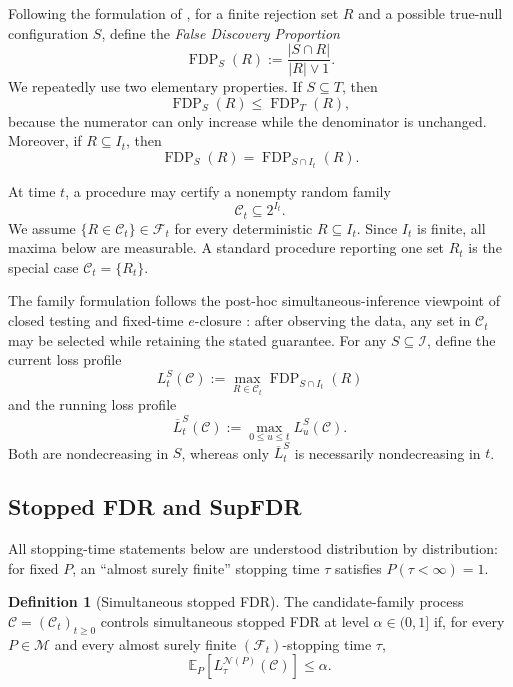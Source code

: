 \documentclass[11pt]{article}
\numberwithin{equation}{section}
\theoremstyle{plain}
\theoremstyle{definition}
\newtheorem{definition}[theorem]{Definition}
\newcommand{\E}{\mathbb E}
\newcommand{\F}{\mathcal F}
\newcommand{\M}{\mathcal M}
\newcommand{\Iuniv}{\mathcal I}
\newcommand{\C}{\mathcal C}
\newcommand{\FDP}{\operatorname{FDP}}
\newcommand{\calN}{\mathcal N}
\newcommand{\loss}{L}
\newcommand{\runloss}{\overline L}
\begin{document}
Following the formulation of \citet{BenjaminiHochberg1995}, for a finite rejection set $R$ and a possible true-null configuration $S$, define the \emph{False Discovery Proportion}
\begin{equation}\label{eq:fdp}
  \FDP_S(R):=\frac{|S\cap R|}{|R|\vee1}.
\end{equation}
We repeatedly use two elementary properties. If $S\subseteq T$, then
\begin{equation}\label{eq:fdp-monotone}
  \FDP_S(R)\leq\FDP_T(R),
\end{equation}
because the numerator can only increase while the denominator is unchanged. Moreover, if $R\subseteq I_t$, then
\begin{equation}\label{eq:fdp-locality}
  \FDP_S(R)=\FDP_{S\cap I_t}(R).
\end{equation}

At time $t$, a procedure may certify a nonempty random family
\[
  \C_t\subseteq2^{I_t}.
\]
We assume $\{R\in\C_t\}\in\F_t$ for every deterministic $R\subseteq I_t$. Since $I_t$ is finite, all maxima below are measurable. A standard procedure reporting one set $R_t$ is the special case $\C_t=\{R_t\}$.

The family formulation follows the post-hoc simultaneous-inference viewpoint of closed testing and fixed-time $e$-closure \citep{GoemanSolari2011,GoemanHemerikSolari2021,XuEtAl2026Closure}: after observing the data, any set in $\C_t$ may be selected while retaining the stated guarantee. For any $S\subseteq\Iuniv$, define the current loss profile
\begin{equation}\label{eq:current-loss}
  \loss_t^S(\C):=\max_{R\in\C_t}\FDP_{S\cap I_t}(R)
\end{equation}
and the running loss profile
\begin{equation}\label{eq:running-loss}
  \runloss_t^S(\C):=\max_{0\leq u\leq t}\loss_u^S(\C).
\end{equation}
Both are nondecreasing in $S$, whereas only $\runloss_t^S$ is necessarily nondecreasing in $t$.

\subsection{Stopped FDR and SupFDR}

All stopping-time statements below are understood distribution by distribution: for fixed $P$, an ``almost surely finite'' stopping time $\tau$ satisfies $P(\tau<\infty)=1$.

\begin{definition}[Simultaneous stopped FDR]\label{def:stopped-fdr}
The candidate-family process $\C=(\C_t)_{t\geq0}$ controls simultaneous stopped FDR at level $\alpha\in(0,1]$ if, for every $P\in\M$ and every almost surely finite $(\F_t)$-stopping time $\tau$,
\begin{equation}\label{eq:stopped-fdr}
  \E_P\!\left[\loss_\tau^{\calN(P)}(\C)\right]\leq\alpha.
\end{equation}
\end{definition}
\end{document}
